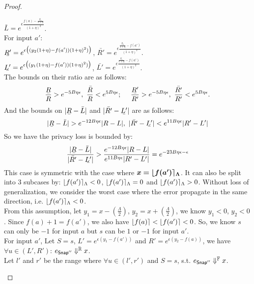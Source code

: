 \documentclass[a4paper,11pt]{article}
\begin{document}
\begin{proof}
\begin{itemize}
		$\bar{L} = e^{\epsilon 
				\frac{f(a) - \frac{y_1}{1 + \eta}}{(1 + \eta)^2}}$.
		\\
		For input $a'$:
		\\
		$\ubar{R'} = e^{\epsilon 
				\big( (y_2(1 + \eta) - f(a')) (1 + \eta)^2) \big)}$, 
		$\bar{R'} = e^{\epsilon 
				\frac{ \frac{y_2}{1 + \eta} - f(a') }{(1 + \eta)^2}}$.
		\\
		$\ubar{L'} = e^{\epsilon 
				\big( (y_1(1 + \eta) - f(a') ) (1 + \eta)^2) \big)}$,
		$\bar{L'} = e^{\epsilon 
				\frac{\frac{y_1}{1 + \eta} - f(a') }{(1 + \eta)^2}}$.
		\\
		The bounds on their ratio are as follows:
		\[
		\frac{\ubar{R}}{R} > e^{-5B\eta \epsilon}, 
		~ \frac{\bar{R}}{R} < e^{5B\eta \epsilon};
		~~~~
		\frac{\ubar{R'}}{R'} > e^{-5B\eta \epsilon}, 
		~ \frac{\bar{R'}}{R'} < e^{5B\eta \epsilon}.
		\]
		And the bounds on $|\ubar{R} - \bar{L}|$ and $|\bar{R'} - \ubar{L'}|$ are as follows:
		\[
		|\ubar{R} - \bar{L}| > e^{-12 B\eta \epsilon}|R - L|, 
		~ |\bar{R'} - \ubar{L'}| < e^{11 B\eta \epsilon}|R' - L'|
		\]
		So we have the privacy loss is bounded by:
		\[
		\frac{|\ubar{R} - \bar{L}|}{|\bar{R'} - \ubar{L'}|}
		> \frac{e^{-12 B\eta \epsilon}|R - L|}{e^{11 B\eta \epsilon}|R' - L'|}
		= e^{-23B \eta \epsilon - \epsilon}
		\]
		This case is symmetric with the case where $\boldsymbol{x = \lfloor f(a') \rceil_{\Lambda}}$.
		It can also be split into 3 subcases by: $\lfloor f(a') \rceil_{\Lambda} < 0$, $\lfloor f(a') \rceil_{\Lambda} = 0$ and $\lfloor f(a') \rceil_{\Lambda} > 0$. 
		Without loss of generalization, we consider the worst case where the error propagate in the same direction, i.e. $\lfloor f(a') \rceil_{\Lambda} < 0$.\\
		From this assumption, let $y_1 = x - (\frac{\Lambda}{2})$, $y_2 = x + (\frac{\Lambda}{2})$, we know $y_1 < 0$, $y_2 < 0$.
		Since $f(a) + 1 = f(a')$, we also have $\lfloor f(a) \rceil < \lfloor f(a') \rceil <0$.
		So, we know $s$ can only be $-1$ for input $a$ but $s$ can be $1$ or $-1$ for input $a'$.
		\\
		For input $a'$, 
		Let $S = s$, $L' = e^{\epsilon(y_1 - f(a'))}$ and $R' = e^{\epsilon(y_2 - f(a))}$, we have $\forall u \in (L', R')$:
		$e_{\mathsf{Snap}''} \Downarrow^{\mathbb{R}} x$.
		\\
		Let $l'$ and $r'$ be the range where $\forall u \in (l', r')$ and $S = s$, s.t.
		$e_{\mathsf{Snap}''} \Downarrow^{\mathbb{F}} x$.
		\\

\end{itemize}
\end{proof}
\end{document}
